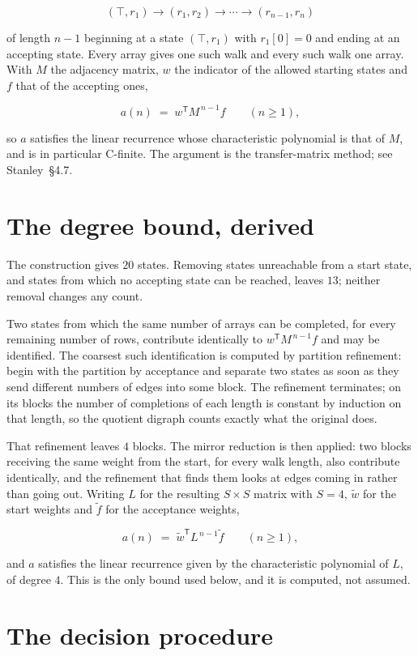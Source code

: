 \documentclass[11pt]{article}
\theoremstyle{definition}
\begin{document}
\[(\top,r_1) \to (r_1,r_2) \to \cdots \to (r_{n-1},r_n)\]

of length $n-1$ beginning at a state $(\top,r_1)$ with $r_1[0]=0$ and ending at an accepting state. Every array gives one such walk and every such walk one array. With $M$ the adjacency matrix, $w$ the indicator of the allowed starting states and $f$ that of the accepting ones,

\[a(n) \;=\; w^{\mathsf T} M^{\,n-1} f \qquad (n \ge 1),\]

so $a$ satisfies the linear recurrence whose characteristic polynomial is that of $M$, and is in particular C-finite. The argument is the transfer-matrix method; see Stanley~\S4.7.

\section{The degree bound, derived}

The construction gives $20$ states. Removing states unreachable from a start state, and states from which no accepting state can be reached, leaves $13$; neither removal changes any count.

Two states from which the same number of arrays can be completed, for every remaining number of rows, contribute identically to $w^{\mathsf T}M^{\,n-1}f$ and may be identified. The coarsest such identification is computed by partition refinement: begin with the partition by acceptance and separate two states as soon as they send different numbers of edges into some block. The refinement terminates; on its blocks the number of completions of each length is constant by induction on that length, so the quotient digraph counts exactly what the original does.

That refinement leaves $4$ blocks. The mirror reduction is then applied: two blocks receiving the same weight from the start, for every walk length, also contribute identically, and the refinement that finds them looks at edges coming in rather than going out. Writing $L$ for the resulting $S \times S$ matrix with $S = 4$, $\tilde w$ for the start weights and $\tilde f$ for the acceptance weights,

\[a(n) \;=\; \tilde w^{\mathsf T} L^{\,n-1} \tilde f \qquad (n \ge 1),\]

and $a$ satisfies the linear recurrence given by the characteristic polynomial of $L$, of degree $4$. This is the only bound used below, and it is computed, not assumed.

\section{The decision procedure}
\end{document}
